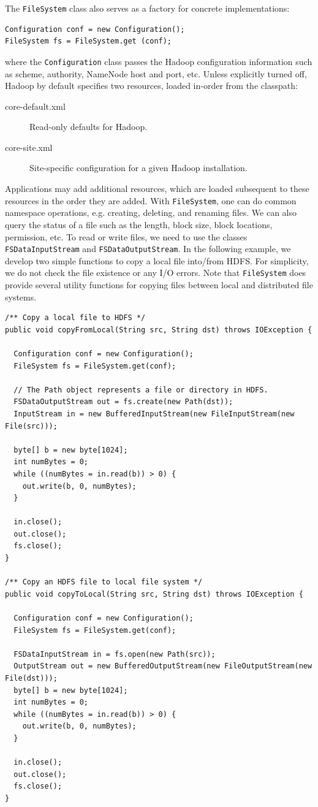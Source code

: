 \documentclass[11pt]{book}
\begin{document}
The \texttt{FileSystem} class also serves as a factory for concrete implementations:
\begin{lstlisting}
Configuration conf = new Configuration();
FileSystem fs = FileSystem.get (conf);
\end{lstlisting}
where the \texttt{Configuration} class passes the Hadoop configuration information such as scheme, authority, NameNode host and port, etc. Unless explicitly turned off, Hadoop by default specifies two resources, loaded in-order from the classpath:
\begin{description}
\item[core-default.xml] Read-only defaults for Hadoop.
\item[core-site.xml] Site-specific configuration for a given Hadoop installation.
\end{description}
Applications may add additional resources, which are loaded subsequent to these resources in the order they are added. With \texttt{FileSystem}, one can do common namespace operations, e.g. creating, deleting, and renaming files. We can also query the status of a file such as the length, block size, block locations, permission, etc. To read or write files, we need to use the classes \texttt{FSDataInputStream} and \texttt{FSDataOutputStream}. In the following example, we develop two simple functions to copy a local file into/from HDFS. For simplicity, we do not check the file existence or any I/O errors. Note that \texttt{FileSystem} does provide several utility functions for copying files between local and distributed file systems.

\begin{lstlisting}
/** Copy a local file to HDFS */
public void copyFromLocal(String src, String dst) throws IOException {
 
  Configuration conf = new Configuration();
  FileSystem fs = FileSystem.get(conf);
  
  // The Path object represents a file or directory in HDFS.
  FSDataOutputStream out = fs.create(new Path(dst));
  InputStream in = new BufferedInputStream(new FileInputStream(new File(src)));
 
  byte[] b = new byte[1024];
  int numBytes = 0;
  while ((numBytes = in.read(b)) > 0) {
    out.write(b, 0, numBytes);
  }
 
  in.close();
  out.close();
  fs.close();
}

/** Copy an HDFS file to local file system */
public void copyToLocal(String src, String dst) throws IOException {
 
  Configuration conf = new Configuration();
  FileSystem fs = FileSystem.get(conf);
 
  FSDataInputStream in = fs.open(new Path(src));
  OutputStream out = new BufferedOutputStream(new FileOutputStream(new File(dst)));
  byte[] b = new byte[1024];
  int numBytes = 0;
  while ((numBytes = in.read(b)) > 0) {
    out.write(b, 0, numBytes);
  }
 
  in.close();
  out.close();
  fs.close();
}
\end{lstlisting}
\end{document}
